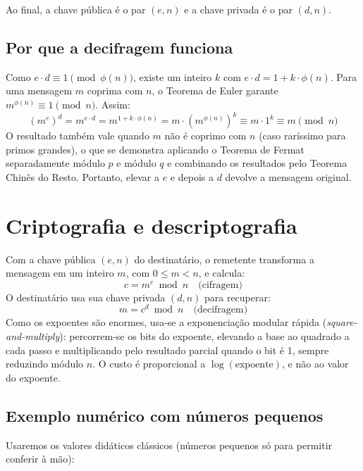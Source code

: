 \documentclass[11pt, a4paper]{article}
\begin{document}
Ao final, a chave pública é o par $(e, n)$ e a chave privada é o par $(d, n)$.

\subsection{Por que a decifragem funciona}
Como $e \cdot d \equiv 1 \pmod{\phi(n)}$, existe um inteiro $k$ com $e \cdot d = 1 + k \cdot \phi(n)$. Para uma mensagem $m$ coprima com $n$, o Teorema de Euler garante $m^{\phi(n)} \equiv 1 \pmod n$. Assim:
\begin{equation}
    (m^e)^d = m^{e \cdot d} = m^{1 + k \cdot \phi(n)} = m \cdot (m^{\phi(n)})^k \equiv m \cdot 1^k \equiv m \pmod n
\end{equation}
O resultado também vale quando $m$ não é coprimo com $n$ (caso raríssimo para primos grandes), o que se demonstra aplicando o Teorema de Fermat separadamente módulo $p$ e módulo $q$ e combinando os resultados pelo Teorema Chinês do Resto. Portanto, elevar a $e$ e depois a $d$ devolve a mensagem original.

\section{Criptografia e descriptografia}
Com a chave pública $(e, n)$ do destinatário, o remetente transforma a mensagem em um inteiro $m$, com $0 \le m < n$, e calcula:
\begin{equation}
    c = m^e \bmod n \quad \text{(cifragem)}
\end{equation}
O destinatário usa sua chave privada $(d, n)$ para recuperar:
\begin{equation}
    m = c^d \bmod n \quad \text{(decifragem)}
\end{equation}
Como os expoentes são enormes, usa-se a exponenciação modular rápida (\textit{square-and-multiply}): percorrem-se os bits do expoente, elevando a base ao quadrado a cada passo e multiplicando pelo resultado parcial quando o bit é 1, sempre reduzindo módulo $n$. O custo é proporcional a $\log(\text{expoente})$, e não ao valor do expoente.

\subsection{Exemplo numérico com números pequenos}
Usaremos os valores didáticos clássicos (números pequenos só para permitir conferir à mão):
\end{document}
